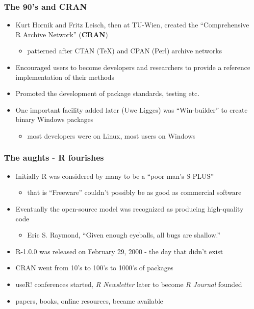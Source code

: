 \documentclass[pdf]{beamer}
\begin{document}
  \begin{frame}\frametitle{The 90's and CRAN}
    \begin{itemize}
      \pause
      \item Kurt Hornik and Fritz Leisch, then at TU-Wien, created the
      ``Comprehensive R Archive Network'' (\textbf{CRAN})
      \begin{itemize}
        \pause
        \item patterned after CTAN (TeX) and CPAN (Perl) archive networks
      \end{itemize}
      \pause
      \item
      Encouraged users to become developers and researchers to provide a
      reference implementation of their methods
      \pause
      \item Promoted the development of package standards, testing etc.
      \pause
      \item One important facility added later (Uwe Ligges) was ``Win-builder'' to
      create binary Windows packages
      \begin{itemize}
        \pause
        \item most developers were on Linux, most users on Windows
      \end{itemize}
    \end{itemize}
  \end{frame}

  \begin{frame}\frametitle{The aughts - R fourishes}
    \begin{itemize}
      \pause
      \item
      Initially R was considered by many to be a ``poor man's S-PLUS''
      \pause
      \begin{itemize}
        \item that is ``Freeware'' couldn't possibly be as good as commercial software
      \end{itemize}
      \pause
      \item
      Eventually the open-source model was recognized as producing high-quality code
      \begin{itemize}
        \pause
        \item Eric S. Raymond, ``Given enough eyeballs, all bugs are shallow.''
      \end{itemize}
      \pause
      \item
      R-1.0.0 was released on February 29, 2000 - the day that didn't exist
      \pause
      \item
      CRAN went from 10's to 100's to 1000's of packages
      \pause
      \item
      useR! conferences started, \emph{R Newsletter} later to become \emph{R
      Journal} founded
      \pause
      \item papers, books, online resources, became available
    \end{itemize}
  \end{frame}
\end{document}
